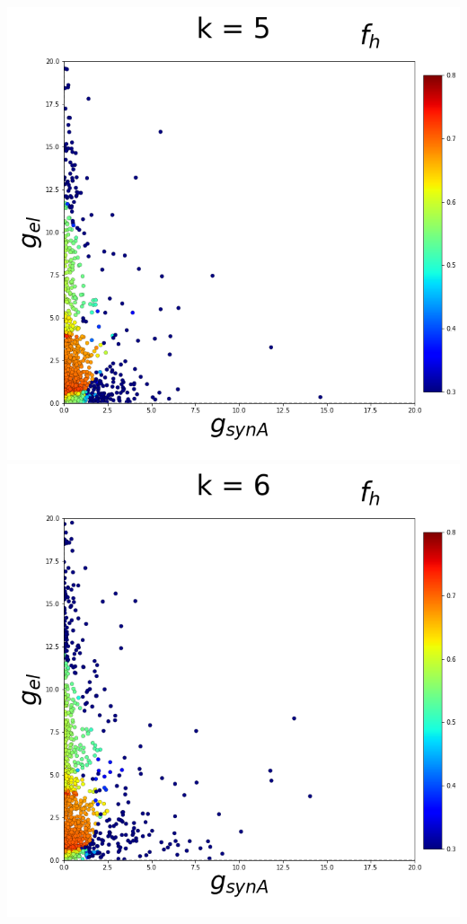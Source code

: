 \documentclass[11pt]{article}
\begin{document}
\begin{center}
\includegraphics[scale=0.125]{DSN_figs/STGCircuit_DSN_c=2_rs=2_k=5.png} \\
\includegraphics[scale=0.125]{DSN_figs/STGCircuit_DSN_c=2_rs=2_k=6.png}

\end{center}
\end{document}
